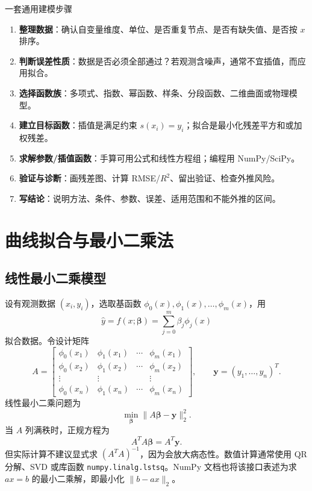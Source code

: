 \documentclass[11pt,a4paper]{ctexart}
\begin{document}
\begin{stepbox}{一套通用建模步骤}
\begin{enumerate}[label=\arabic*)]
  \item \textbf{整理数据}：确认自变量维度、单位、是否重复节点、是否有缺失值、是否按 $x$ 排序。
  \item \textbf{判断误差性质}：数据是否必须全部通过？若观测含噪声，通常不宜插值，而应用拟合。
  \item \textbf{选择函数族}：多项式、指数、幂函数、样条、分段函数、二维曲面或物理模型。
  \item \textbf{建立目标函数}：插值是满足约束 $s(x_i)=y_i$；拟合是最小化残差平方和或加权残差。
  \item \textbf{求解参数/插值函数}：手算可用公式和线性方程组；编程用 NumPy/SciPy。
  \item \textbf{验证与诊断}：画残差图、计算 RMSE/$R^2$、留出验证、检查外推风险。
  \item \textbf{写结论}：说明方法、条件、参数、误差、适用范围和不能外推的区间。
\end{enumerate}
\end{stepbox}

\newpage
\section{曲线拟合与最小二乘法}

\subsection{线性最小二乘模型}

设有观测数据 $(x_i,y_i)$，选取基函数 $\phi_0(x),\phi_1(x),\ldots,\phi_m(x)$，用
\[
  \hat y = f(x;\bm\beta)=\sum_{j=0}^{m}\beta_j\phi_j(x)
\]
拟合数据。令设计矩阵
\[
A=\begin{bmatrix}
\phi_0(x_1)&\phi_1(x_1)&\cdots&\phi_m(x_1)\\
\phi_0(x_2)&\phi_1(x_2)&\cdots&\phi_m(x_2)\\
\vdots&\vdots&&\vdots\\
\phi_0(x_n)&\phi_1(x_n)&\cdots&\phi_m(x_n)
\end{bmatrix},\qquad
\bm y=(y_1,\ldots,y_n)^T.
\]
线性最小二乘问题为
\[
  \min_{\bm\beta}\|A\bm\beta-\bm y\|_2^2.
\]
当 $A$ 列满秩时，正规方程为
\[
  A^T A\bm\beta=A^T\bm y.
\]
但实际计算不建议显式求 $(A^TA)^{-1}$，因为会放大病态性。数值计算通常使用 QR 分解、SVD 或库函数 \verb|numpy.linalg.lstsq|。NumPy 文档也将该接口表述为求 $a x=b$ 的最小二乘解，即最小化 $\|b-ax\|_2$。
\end{document}
